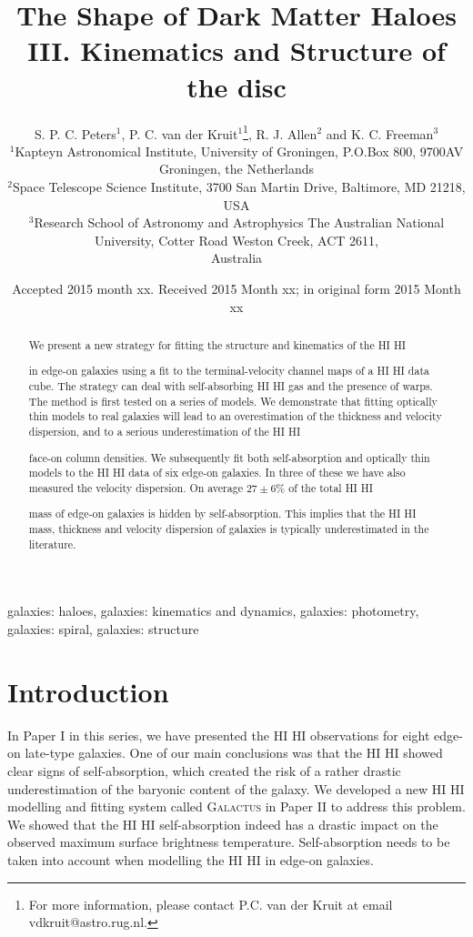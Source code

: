 \documentclass[useAMS,usenatbib]{mn2e}
\title[The Shape of Dark Matter Haloes III. Kinematics and Structure of the \hi Disc]{The Shape of Dark Matter Haloes\\
III. Kinematics and Structure of the \hi disc}
\author[S. P. C. Peters et al.]{S. P. C. Peters$^{1}$,
P. C. van der Kruit$^{1}$\thanks{For more information, 
please contact P.C. van der Kruit at email vdkruit@astro.rug.nl.}, 
R. J. Allen$^{2}$ and K. C. Freeman$^{3}$\\
$^{1}$Kapteyn Astronomical Institute, University of Groningen, P.O.Box 800, 9700AV Groningen, the Netherlands\\
$^{2}$Space Telescope Science Institute, 3700 San Martin Drive, Baltimore, MD 21218, USA\\
$^{3}$Research School of Astronomy and Astrophysics The Australian National University, Cotter Road Weston Creek, ACT 2611,\\
Australia}
\newcommand{\hi}{%
  \relax
  \ifmmode
    \textrm{\textsc{HI}}
  \else
    \textsc{H{\smaller}I}
  \fi
}
\begin{document}
\date{Accepted 2015 month xx. Received 2015 Month xx; in original form 2015 Month xx}
\pagerange{\pageref{firstpage}--\pageref{lastpage}} 



\maketitle

\label{firstpage}

\begin{abstract}
We present a new strategy for fitting the structure and kinematics of the \hi 
in edge-on 
                 galaxies using a fit to the terminal-velocity channel maps 
of a  \hi data cube. 
				The strategy can deal with self-absorbing 
\hi gas and the presence of warps.
                The method is first tested on a series of models.
                We demonstrate that fitting optically thin models to real 
galaxies will lead to an overestimation of the thickness and velocity 
                 dispersion, and to a serious underestimation of the \hi 
face-on column densities.
                We subsequently fit both self-absorption and optically 
thin models to the \hi data of six edge-on galaxies. In three of 
                 these we have also measured the velocity dispersion. 
				On average $27\pm6\%$ of the total \hi 
mass of edge-on galaxies is hidden by self-absorption.
				This implies that the \hi mass, thickness 
and velocity dispersion of galaxies is typically underestimated in the 
literature.
\end{abstract}

\begin{keywords}
galaxies: haloes, galaxies: kinematics and dynamics, galaxies: photometry,
galaxies: spiral, galaxies: structure
\end{keywords}

\section{Introduction}
In Paper I in this series, 
we have presented the \hi observations for eight edge-on late-type galaxies.
One of our main conclusions was that the \hi showed clear signs of 
self-absorption, which created the risk of a rather drastic underestimation 
of the baryonic content of the galaxy.
We developed a new \hi modelling and fitting system called \textsc{Galactus} 
in Paper II to address this problem.
We showed that the \hi self-absorption indeed has a drastic impact on the 
observed maximum surface brightness temperature.
Self-absorption needs to be taken into account when modelling the \hi in 
edge-on galaxies.
\end{document}
